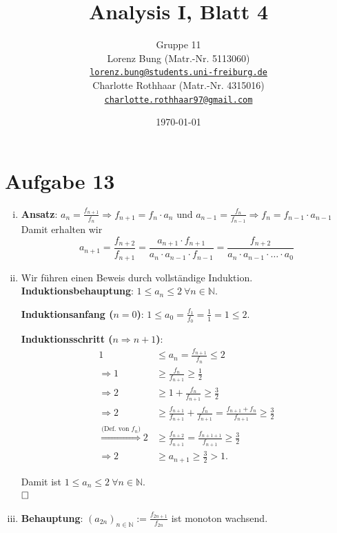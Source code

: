 \documentclass[12pt,a4paper]{article}
\title{Analysis I, Blatt 4}
\author{
    Gruppe 11\\
    Lorenz Bung (Matr.-Nr. 5113060)\\
    \href{mailto:lorenz.bung@students.uni-freiburg.de}{\texttt{lorenz.bung@students.uni-freiburg.de}}\\
    Charlotte Rothhaar (Matr.-Nr. 4315016)\\
    \href{mailto:charlotte.rothhaar97@gmail.com}{\texttt{charlotte.rothhaar97@gmail.com}}
}
\date{\today}
\newcommand{\qed}{\null\nobreak\hfill\square}
\begin{document}
\maketitle


\section*{Aufgabe 13}

\begin{enumerate}[(i)]
    \item \textbf{Ansatz}: $a_n = \frac{f_{n+1}}{f_n} \Rightarrow f_{n+1} = f_n \cdot a_n$ und $a_{n-1} = \frac{f_n}{f_{n-1}} \Rightarrow f_n = f_{n-1} \cdot a_{n-1}$\\

    Damit erhalten wir
    $$a_{n+1} = \frac{f_{n+2}}{f_{n+1}} = \frac{a_{n+1} \cdot f_{n+1}}{a_n \cdot a_{n-1} \cdot f_{n-1}} = \frac{f_{n+2}}{a_n \cdot a_{n-1} \cdot \ldots \cdot a_0}$$

    \item Wir führen einen Beweis durch vollständige Induktion.\\

    \textbf{Induktionsbehauptung}: $1 \leq a_n \leq 2\ \forall n \in \mathbb{N}$.

    \textbf{Induktionsanfang ($n=0$)}: $1 \leq a_0 = \frac{f_1}{f_0} = \frac{1}{1} = 1 \leq 2$.

    \textbf{Induktionsschritt ($n \Rightarrow n+1$)}:
    \begin{align*}
    1 &\leq a_n = \frac{f_{n+1}}{f_n} \leq 2\\
    \Rightarrow 1 &\geq \frac{f_n}{f_{n+1}} \geq \frac{1}{2}\\
    \Rightarrow 2 &\geq 1 + \frac{f_n}{f_{n+1}} \geq \frac{3}{2}\\
    \Rightarrow 2 &\geq \frac{f_{n+1}}{f_{n+1}} + \frac{f_n}{f_{n+1}} = \frac{f_{n+1} + f_n}{f_{n+1}} \geq \frac{3}{2}\\
    \overset{\text{(Def. von } f_n\text{)}}{\Rightarrow} 2 &\geq \frac{f_{n+2}}{f_{n+1}} = \frac{f_{n+1+1}}{f_{n+1}} \geq \frac{3}{2}\\
    \Rightarrow 2 &\geq a_{n+1} \geq \frac{3}{2} > 1.
    \end{align*}

    Damit ist $1 \leq a_n \leq 2\ \forall n \in \mathbb{N}$.\\
    $\qed$

    \item \textbf{Behauptung}: $(a_{2n})_{n \in \mathbb{N}} := \frac{f_{2n+1}}{f_{2n}}$ ist monoton wachsend.\\


\end{enumerate}
\end{document}
